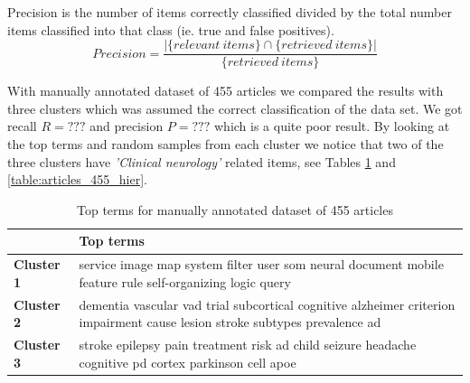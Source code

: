 Precision is the number of items correctly classified divided by 
the total number items classified into that class (ie. true and 
false positives).
\begin{equation}
 Precision = \frac{|\{relevant\ items\} \cap \{retrieved\ 
items\}|} 
{\{retrieved\ items\}}
\end{equation}

With manually annotated dataset of 455 articles we compared 
the results with three clusters which was assumed the correct 
classification of the data set. We got recall $R = ???$ and 
precision $P = ???$ which is
a quite poor result. By looking at the top terms and random samples
from each cluster we notice that two of the three clusters have 
\emph{'Clinical neurology'} related items, see Tables
\ref{table:topterms_455_hier} and \ref{table:articles_455_hier}.

\begin{table}
\begin{tabular}{|p{2cm}|p{10.5cm}|} 
\hline %
\textbf{ } & \textbf{Top terms} \\ 
\hline 
\textbf{Cluster 1} & service image map system filter user som neural document mobile feature rule self-organizing logic query  \\ 
\hline
\hline 
\textbf{Cluster 2} & dementia vascular vad trial subcortical cognitive alzheimer criterion impairment cause lesion stroke subtypes prevalence ad  \\ 
\hline
\hline 
\textbf{Cluster 3} & stroke epilepsy pain treatment risk ad child seizure headache cognitive pd cortex parkinson cell apoe \\ 
\hline
\hline 
\end{tabular} %
\caption{Top terms for manually annotated dataset of 455 articles}
\label{table:topterms_455_hier}
\end{table} %

